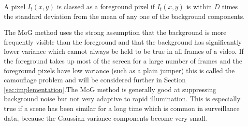 A pixel $I_t(x,y)$ is classed as a foreground pixel if $I_t(x,y)$ is within $D$ times the standard deviation from the mean of any one of the background components. 

The MoG method uses the strong assumption that the background is more frequently visible than the foreground and that the background has significantly lower variance which cannot always be held to be true in all frames of a video. If the foreground takes up most of the screen for a large number of frames and the foreground pixels have low variance (such as a plain jumper) this is called the camouflage problem and will be considered further in Section \ref{sec:implementation}.The MoG method is generally good at suppressing background noise but not very adaptive to rapid illumination. This is especially true if a scene has been similar for a long time which is common in surveillance data, because the Gaussian variance components become very small.







